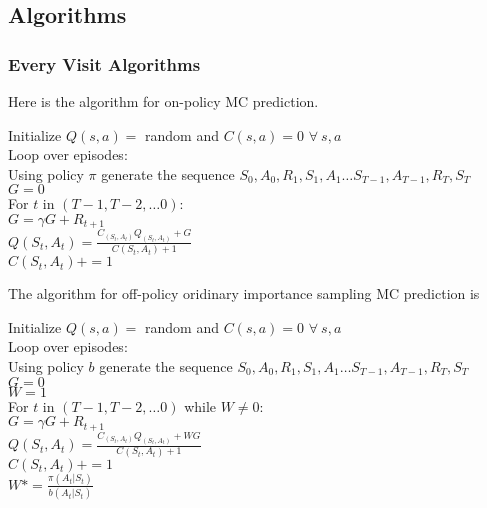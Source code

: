 \documentclass[11pt,a4paper]{article}
\begin{document}
\subsection{Algorithms}

\subsubsection{Every Visit Algorithms}
Here is the algorithm for on-policy MC prediction.

\begin{tcolorbox}[enhanced,title=On-policy prediction]
Initialize $Q(s,a)=$ random and $C(s,a)=0$ $\forall~s,a$ \\
Loop over episodes: \\
 \phantom{abcd} Using policy $\pi$ generate the sequence $S_0,A_0, R_1,S_1,A_1 \dots S_{T-1}, A_{T-1},R_T,S_T$ \\
 \phantom{abcd} $G=0$ \\
  \phantom{abcd} For $t$ in $(T-1,T-2,\dots 0)$: \\
  \phantom{abcd}   \phantom{abcd}  $G = \gamma G + R_{t+1}$ \\
  \phantom{abcd}   \phantom{abcd}  $Q(S_t,A_t) = \frac{C_(S_t,A_t) Q_(S_t,A_t) +G}{C(S_t,A_t)+1}$ \\
    \phantom{abcd}   \phantom{abcd}  $C(S_t,A_t) += 1$
\end{tcolorbox}

The algorithm for off-policy oridinary importance sampling MC prediction is

\begin{tcolorbox}[enhanced,title=Off-policy ordinary importance sampling prediction]
Initialize $Q(s,a)=$ random and $C(s,a)=0$ $\forall~s,a$ \\
Loop over episodes: \\
 \phantom{abcd} Using policy $b$ generate the sequence  $S_0,A_0, R_1,S_1,A_1 \dots S_{T-1}, A_{T-1},R_T,S_T$ \\
 \phantom{abcd} $G=0$ \\
  \phantom{abcd} $W=1$ \\
  \phantom{abcd} For $t$ in $(T-1,T-2,\dots 0)$ while $W \ne 0$: \\
  \phantom{abcd}   \phantom{abcd}  $G = \gamma G + R_{t+1}$ \\
  \phantom{abcd}   \phantom{abcd}  $Q(S_t,A_t) = \frac{C_(S_t,A_t) Q_(S_t,A_t) +W G}{C(S_t,A_t)+1}$ \\
    \phantom{abcd}   \phantom{abcd}  $C(S_t,A_t) += 1$ \\
    \phantom{abcd}   \phantom{abcd}  $W*= \frac{\pi(A_t|S_t)}{b(A_t|S_t)}$   
\end{tcolorbox}
\end{document}
